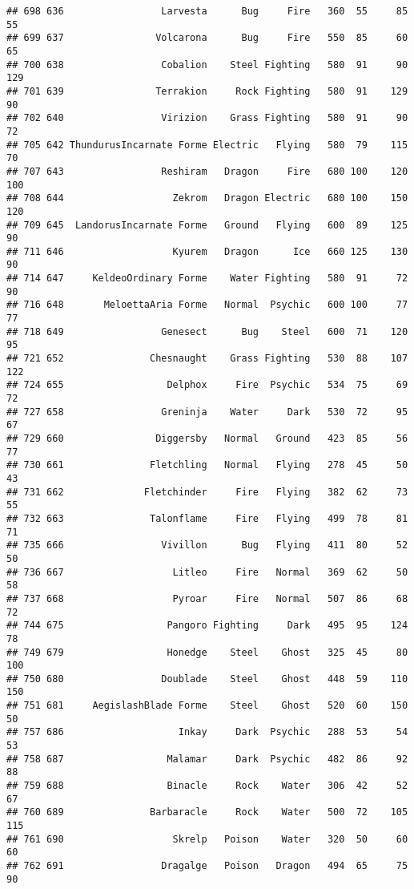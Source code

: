 \documentclass[
]{article}
\begin{document}
\begin{verbatim}
## 698 636                 Larvesta      Bug     Fire   360  55     85      55
## 699 637                Volcarona      Bug     Fire   550  85     60      65
## 700 638                 Cobalion    Steel Fighting   580  91     90     129
## 701 639                Terrakion     Rock Fighting   580  91    129      90
## 702 640                 Virizion    Grass Fighting   580  91     90      72
## 705 642 ThundurusIncarnate Forme Electric   Flying   580  79    115      70
## 707 643                 Reshiram   Dragon     Fire   680 100    120     100
## 708 644                   Zekrom   Dragon Electric   680 100    150     120
## 709 645  LandorusIncarnate Forme   Ground   Flying   600  89    125      90
## 711 646                   Kyurem   Dragon      Ice   660 125    130      90
## 714 647     KeldeoOrdinary Forme    Water Fighting   580  91     72      90
## 716 648       MeloettaAria Forme   Normal  Psychic   600 100     77      77
## 718 649                 Genesect      Bug    Steel   600  71    120      95
## 721 652               Chesnaught    Grass Fighting   530  88    107     122
## 724 655                  Delphox     Fire  Psychic   534  75     69      72
## 727 658                 Greninja    Water     Dark   530  72     95      67
## 729 660                Diggersby   Normal   Ground   423  85     56      77
## 730 661               Fletchling   Normal   Flying   278  45     50      43
## 731 662              Fletchinder     Fire   Flying   382  62     73      55
## 732 663               Talonflame     Fire   Flying   499  78     81      71
## 735 666                 Vivillon      Bug   Flying   411  80     52      50
## 736 667                   Litleo     Fire   Normal   369  62     50      58
## 737 668                   Pyroar     Fire   Normal   507  86     68      72
## 744 675                  Pangoro Fighting     Dark   495  95    124      78
## 749 679                  Honedge    Steel    Ghost   325  45     80     100
## 750 680                 Doublade    Steel    Ghost   448  59    110     150
## 751 681     AegislashBlade Forme    Steel    Ghost   520  60    150      50
## 757 686                    Inkay     Dark  Psychic   288  53     54      53
## 758 687                  Malamar     Dark  Psychic   482  86     92      88
## 759 688                  Binacle     Rock    Water   306  42     52      67
## 760 689               Barbaracle     Rock    Water   500  72    105     115
## 761 690                   Skrelp   Poison    Water   320  50     60      60
## 762 691                 Dragalge   Poison   Dragon   494  65     75      90

\end{verbatim}
\end{document}

